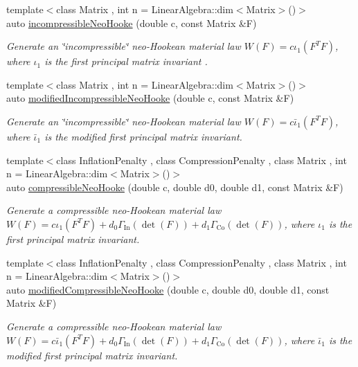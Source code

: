\begin{DoxyCompactItemize}
{\footnotesize template$<$class Matrix , int n = Linear\-Algebra\-::dim$<$\-Matrix$>$()$>$ }\\auto \hyperlink{group__Rubber_gad0d93d6dfb3693483fcd37144959de24}{incompressible\-Neo\-Hooke} (double c, const Matrix \&F)
\begin{DoxyCompactList}\small\item\em Generate an \char`\"{}incompressible\char`\"{} neo-\/\-Hookean material law $ W(F)=c\iota_1(F^T F) $, where $\iota_1$ is the first principal matrix invariant . \end{DoxyCompactList}\item 
{\footnotesize template$<$class Matrix , int n = Linear\-Algebra\-::dim$<$\-Matrix$>$()$>$ }\\auto \hyperlink{group__Rubber_gae9f87c6f1fd4edddd0894edefd9fb9a5}{modified\-Incompressible\-Neo\-Hooke} (double c, const Matrix \&F)
\begin{DoxyCompactList}\small\item\em Generate an \char`\"{}incompressible\char`\"{} neo-\/\-Hookean material law $ W(F)=c\bar\iota_1(F^T F) $, where $\bar\iota_1$ is the modified first principal matrix invariant. \end{DoxyCompactList}\item 
{\footnotesize template$<$class Inflation\-Penalty , class Compression\-Penalty , class Matrix , int n = Linear\-Algebra\-::dim$<$\-Matrix$>$()$>$ }\\auto \hyperlink{group__Rubber_ga03b9323b57ee11b09ed0515d6ea5b01b}{compressible\-Neo\-Hooke} (double c, double d0, double d1, const Matrix \&F)
\begin{DoxyCompactList}\small\item\em Generate a compressible neo-\/\-Hookean material law $ W(F)=c\iota_1(F^T F)+d_0\Gamma_\mathrm{In}(\det(F))+d_1\Gamma_\mathrm{Co}(\det(F)) $, where $\iota_1$ is the first principal matrix invariant. \end{DoxyCompactList}\item 
{\footnotesize template$<$class Inflation\-Penalty , class Compression\-Penalty , class Matrix , int n = Linear\-Algebra\-::dim$<$\-Matrix$>$()$>$ }\\auto \hyperlink{group__Rubber_ga77093789a2488adcffd7d3f97b8a75e4}{modified\-Compressible\-Neo\-Hooke} (double c, double d0, double d1, const Matrix \&F)
\begin{DoxyCompactList}\small\item\em Generate a compressible neo-\/\-Hookean material law $ W(F)=c\bar\iota_1(F^T F)+d_0\Gamma_\mathrm{In}(\det(F))+d_1\Gamma_\mathrm{Co}(\det(F)) $, where $\bar\iota_1$ is the modified first principal matrix invariant. \end{DoxyCompactList}\item 

\end{DoxyCompactItemize}
